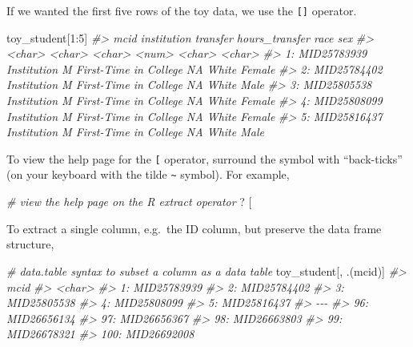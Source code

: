 \documentclass[
]{book}
\newenvironment{Shaded}{\begin{snugshade}}{\end{snugshade}}
\newcommand{\AttributeTok}[1]{\textcolor[rgb]{0.77,0.63,0.00}{#1}}
\newcommand{\CommentTok}[1]{\textcolor[rgb]{0.56,0.35,0.01}{\textit{#1}}}
\newcommand{\DecValTok}[1]{\textcolor[rgb]{0.00,0.00,0.81}{#1}}
\newcommand{\NormalTok}[1]{#1}
\newcommand{\SpecialCharTok}[1]{\textcolor[rgb]{0.00,0.00,0.00}{#1}}
\newcommand{\StringTok}[1]{\textcolor[rgb]{0.31,0.60,0.02}{#1}}
\begin{document}
If we wanted the first five rows of the toy data, we use the \texttt{{[}{]}} operator.

\begin{Shaded}
\begin{Highlighting}[]
\NormalTok{toy\_student[}\DecValTok{1}\SpecialCharTok{:}\DecValTok{5}\NormalTok{]}
\CommentTok{\#\textgreater{}           mcid   institution              transfer hours\_transfer   race    sex}
\CommentTok{\#\textgreater{}         \textless{}char\textgreater{}        \textless{}char\textgreater{}                \textless{}char\textgreater{}          \textless{}num\textgreater{} \textless{}char\textgreater{} \textless{}char\textgreater{}}
\CommentTok{\#\textgreater{} 1: MID25783939 Institution M First{-}Time in College             NA  White Female}
\CommentTok{\#\textgreater{} 2: MID25784402 Institution M First{-}Time in College             NA  White   Male}
\CommentTok{\#\textgreater{} 3: MID25805538 Institution M First{-}Time in College             NA  White Female}
\CommentTok{\#\textgreater{} 4: MID25808099 Institution M First{-}Time in College             NA  White Female}
\CommentTok{\#\textgreater{} 5: MID25816437 Institution M First{-}Time in College             NA  White   Male}
\end{Highlighting}
\end{Shaded}

To view the help page for the \texttt{{[}} operator, surround the symbol with ``back-ticks'' (on your keyboard with the tilde \texttt{\textasciitilde{}} symbol). For example,

\begin{Shaded}
\begin{Highlighting}[]
\CommentTok{\# view the help page on the R extract operator}
\NormalTok{? }\StringTok{\textasciigrave{}}\AttributeTok{[}\StringTok{\textasciigrave{}}
\end{Highlighting}
\end{Shaded}

To extract a single column, e.g.~the ID column, but preserve the data frame structure,

\begin{Shaded}
\begin{Highlighting}[]
\CommentTok{\# data.table syntax to subset a column as a data table}
\NormalTok{toy\_student[, .(mcid)]}
\CommentTok{\#\textgreater{}             mcid}
\CommentTok{\#\textgreater{}           \textless{}char\textgreater{}}
\CommentTok{\#\textgreater{}   1: MID25783939}
\CommentTok{\#\textgreater{}   2: MID25784402}
\CommentTok{\#\textgreater{}   3: MID25805538}
\CommentTok{\#\textgreater{}   4: MID25808099}
\CommentTok{\#\textgreater{}   5: MID25816437}
\CommentTok{\#\textgreater{}  {-}{-}{-}            }
\CommentTok{\#\textgreater{}  96: MID26656134}
\CommentTok{\#\textgreater{}  97: MID26656367}
\CommentTok{\#\textgreater{}  98: MID26663803}
\CommentTok{\#\textgreater{}  99: MID26678321}
\CommentTok{\#\textgreater{} 100: MID26692008}
\end{Highlighting}
\end{Shaded}
\end{document}
